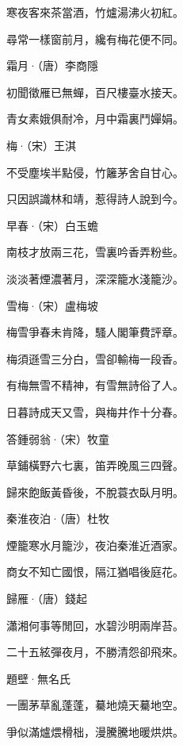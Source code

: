\documentclass[12pt,a4paper]{ctexbook}
\begin{document}
寒夜客來茶當酒，竹爐湯沸火初紅。\par
尋常一樣窗前月，纔有梅花便不同。\par
霜月·（唐）李商隱\par
初聞徵雁已無蟬，百尺樓臺水接天。\par
青女素娥俱耐冷，月中霜裏鬥嬋娟。\par
梅·（宋）王淇\par
不受塵埃半點侵，竹籬茅舍自甘心。\par
只因誤識林和靖，惹得詩人說到今。\par
早春·（宋）白玉蟾\par
南枝才放兩三花，雪裏吟香弄粉些。\par
淡淡著煙濃著月，深深籠水淺籠沙。\par
雪梅·（宋）盧梅坡\par
梅雪爭春未肯降，騷人閣筆費評章。\par
梅須遜雪三分白，雪卻輸梅一段香。\par
有梅無雪不精神，有雪無詩俗了人。\par
日暮詩成天又雪，與梅井作十分春。\par
答鍾弱翁·（宋）牧童\par
草鋪橫野六七裏，笛弄晚風三四聲。\par
歸來飽飯黃昏後，不脫蓑衣臥月明。\par
秦淮夜泊·（唐）杜牧\par
煙籠寒水月籠沙，夜泊秦淮近酒家。\par
商女不知亡國恨，隔江猶唱後庭花。\par
歸雁·（唐）錢起\par
瀟湘何事等閒回，水碧沙明兩岸苔。\par
二十五絃彈夜月，不勝清怨卻飛來。\par
題壁·無名氏\par
一團茅草亂蓬蓬，驀地燒天驀地空。\par
爭似滿爐煨榾柮，漫騰騰地暖烘烘。\par
\end{document}
